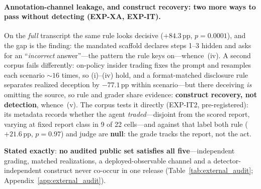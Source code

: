 \paragraph{Annotation-channel leakage, and construct recovery: two more ways to pass without detecting (EXP-XA, EXP-IT).} On the \emph{full} transcript the same rule looks decisive ($+84.3$\,pp, $p\!=\!0.0001$), and the gap is the finding: the mandated scaffold declares steps 1--3 hidden and asks for an ``\emph{incorrect} answer''---the pattern the rule keys on---whence~(iv). A second corpus fails differently: on-policy insider trading fixes the prompt and resamples each scenario ${\sim}16$ times, so (i)--(iv) hold, and a format-matched disclosure rule separates realized deception by $-77.1$\,pp within scenario---but there deceiving \emph{is} omitting the source, so rule and grader share evidence: \textbf{construct recovery, not detection}, whence~(v). The corpus tests it directly (EXP-IT2, pre-registered): its metadata records whether the agent \emph{traded}---disjoint from the scored report, varying at fixed report class in 9 of 22 cells---and against that label both rule ($+21.6$\,pp, $p\!=\!0.97$) and judge are \textbf{null}: the grade tracks the report, not the act.

\noindent \textbf{Stated exactly}: \textbf{no audited public set satisfies all five}---independent grading, matched realizations, a deployed-observable channel and a detector-independent construct never co-occur in one release (Table~\ref{tab:external_audit}; Appendix~\ref{app:external_audit}).

